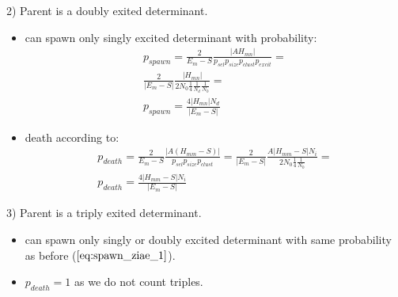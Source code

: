 \documentclass[twoside,english]{uiofysmaster}
\theoremstyle{definition}
\begin{document}
\begin{enumerate}
	2) Parent is a doubly exited determinant.
	
	\begin{itemize}
		\item can spawn only singly excited determinant with probability:
		\begin{align}\label{eq:spawn_ziae_1}
		p_{spawn} = \frac{2}{E_m - S} \frac{|AH_{mn}|}{ p_{sel}  p_{size} p_{clust} p_{excit} }=\\
		\frac{2}{|E_m  - S|} \frac{|H_{mn}|}{2N_0 \frac{1}{4} \frac{1}{N_d} \frac{1}{N_0}} =\\
		p_{spawn} =\frac{4|H_{mn}|N_d}{|E_m  - S|}
		\end{align}
		\item death according to:
		\begin{align}
		p_{death} = \frac{2}{E_m - S} \frac{|A(H_{mm}-S)|}{ p_{sel}  p_{size} p_{clust} }= \frac{2}{|E_m - S|} \frac{A|H_{mm}-S|N_i}{ 2N_0 \frac{1}{4} \frac{1}{N_0}}=\\
		p_{death} = \frac{4|H_{mm}-S|N_i}{|E_m - S|} 
		\end{align}
	\end{itemize}
	3) Parent is a triply exited determinant.
	\begin{itemize}
		\item can spawn only singly or doubly excited determinant with same probability as before ($\ref{eq:spawn_ziae_1}$).
		\item $p_{death} = 1$ as we do not count triples.
	\end{itemize}
	

\end{enumerate}
\end{document}
